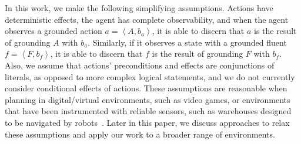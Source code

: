 \documentclass{article}
\newcommand{\tuple}[1]{\ensuremath{\left \langle #1 \right \rangle }}
\newcommand{\liftf}{F}
\newcommand{\liftl}{L}
\newcommand{\lifta}{A}
\begin{document}
In this work, we make the following simplifying assumptions. 
Actions have deterministic effects, 
the agent has complete observability, 
and when the agent observes a grounded action $a=\tuple{\lifta, b_a}$, it is able to discern that $a$ is the result of grounding $\lifta$ with $b_a$. 
Similarly, if it observes a state with a grounded fluent $f=\tuple{\liftf, b_f}$, it is able to discern that $f$ is the result of grounding $\liftf$ with $b_f$. Also, we assume that actions' preconditions and effects are conjunctions of literals, as opposed to more complex logical statements, and we do not currently consider conditional effects of actions. 
These assumptions are reasonable when planning in digital/virtual environments, such as video games, or environments that have been instrumented with reliable sensors, such as warehouses designed to be navigated by robots~\cite{li2020lifelong}. 
Later in this paper, we discuss approaches to relax these assumptions and apply our work to a broader range of environments. 




\end{document}
